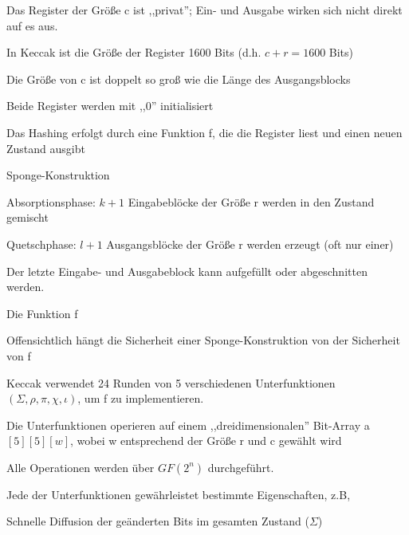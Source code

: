 \documentclass[a4paper]{article}
\begin{document}
\begin{multicols}{3}
\begin{itemize*}
\begin{itemize*}
                  \item Das Register der Größe c ist ,,privat''; Ein- und Ausgabe wirken sich nicht direkt auf es aus.
                  \item In Keccak ist die Größe der Register 1600 Bits (d.h. $c+r=1600$ Bits)
                  \item Die Größe von c ist doppelt so groß wie die Länge des Ausgangsblocks
                  \item Beide Register werden mit ,,0'' initialisiert
            \end{itemize*}
            \item Das Hashing erfolgt durch eine Funktion f, die die Register liest und einen neuen Zustand ausgibt
            \item Sponge-Konstruktion
            \begin{itemize*}
                  \item Absorptionsphase: $k + 1$ Eingabeblöcke der Größe r werden in den Zustand gemischt
                  \item Quetschphase: $l + 1$ Ausgangsblöcke der Größe r werden erzeugt (oft nur einer)
                  \item Der letzte Eingabe- und Ausgabeblock kann aufgefüllt oder abgeschnitten werden.
            \end{itemize*}
            \item Die Funktion f
            \begin{itemize*}
                  \item Offensichtlich hängt die Sicherheit einer Sponge-Konstruktion von der Sicherheit von f
                  \item Keccak verwendet 24 Runden von 5 verschiedenen Unterfunktionen $(\Sigma, \rho, \pi,\chi,\iota)$, um f zu implementieren.
                  \item Die Unterfunktionen operieren auf einem ,,dreidimensionalen'' Bit-Array a $[5][5][w]$, wobei w entsprechend der Größe r und c gewählt wird
                  \item Alle Operationen werden über $GF(2^n)$ durchgeführt.
                  \item Jede der Unterfunktionen gewährleistet bestimmte Eigenschaften, z.B,
                  \begin{itemize*}
                        \item Schnelle Diffusion der geänderten Bits im gesamten Zustand ($\Sigma$)

\end{itemize*}
\end{itemize*}
\end{itemize*}
\end{multicols}
\end{document}

